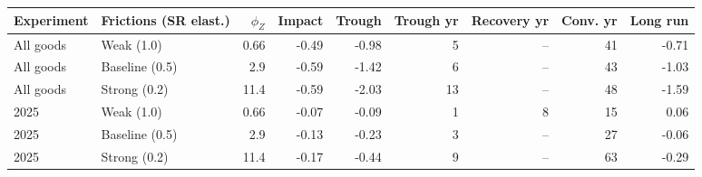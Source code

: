 \begin{tabular}{llrrrrrrr}
\toprule
Experiment & Frictions (SR elast.) & $\phi_Z$ & Impact & Trough & Trough yr & Recovery yr & Conv. yr & Long run \\
\midrule
All goods & Weak (1.0) & 0.66 & -0.49 & -0.98 & 5 & -- & 41 & -0.71 \\
All goods & Baseline (0.5) & 2.9 & -0.59 & -1.42 & 6 & -- & 43 & -1.03 \\
All goods & Strong (0.2) & 11.4 & -0.59 & -2.03 & 13 & -- & 48 & -1.59 \\
\midrule
2025 & Weak (1.0) & 0.66 & -0.07 & -0.09 & 1 & 8 & 15 & 0.06 \\
2025 & Baseline (0.5) & 2.9 & -0.13 & -0.23 & 3 & -- & 27 & -0.06 \\
2025 & Strong (0.2) & 11.4 & -0.17 & -0.44 & 9 & -- & 63 & -0.29 \\
\bottomrule
\end{tabular}
